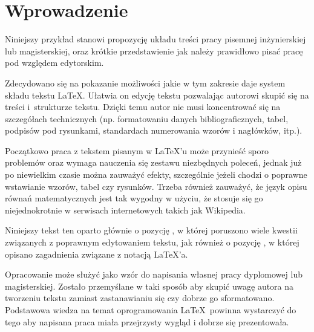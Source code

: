 \section{Wprowadzenie}

Niniejszy przykład stanowi propozycję układu treści pracy pisemnej inżynierskiej lub magisterskiej, oraz krótkie przedstawienie jak należy prawidłowo pisać pracę pod względem edytorskim.

Zdecydowano się na pokazanie możliwości jakie w tym zakresie daje system składu tekstu \LaTeX. Ułatwia on edycję tekstu pozwalając autorowi skupić się na treści i~strukturze tekstu. Dzięki temu autor nie musi koncentrować się na szczegółach technicznych (np. formatowaniu danych bibliograficznych, tabel, podpisów pod rysunkami, standardach numerowania wzorów i nagłówków, itp.).

Początkowo praca z tekstem pisanym w \LaTeX 'u może przynieść sporo problemów oraz wymaga nauczenia się zestawu niezbędnych poleceń, jednak już po niewielkim czasie można zauważyć efekty, szczególnie jeżeli chodzi o poprawne wstawianie wzorów, tabel czy rysunków. Trzeba również zauważyć, że język opisu równań matematycznych jest tak wygodny w użyciu, że stosuje się go niejednokrotnie w serwisach internetowych takich jak Wikipedia.

Niniejszy tekst ten oparto głównie o pozycję \cite{Osuchowska:1998}, w której poruszono wiele kwestii związanych z poprawnym edytowaniem tekstu, jak również o pozycję \cite{latex:2007}, w której opisano zagadnienia związane z notacją \LaTeX 'a.

Opracowanie może służyć jako wzór do napisania własnej pracy dyplomowej lub magisterskiej. Zostało przemyślane w taki sposób aby skupić uwagę autora na tworzeniu tekstu zamiast zastanawianiu się czy dobrze go sformatowano. Podstawowa wiedza na temat oprogramowania \LaTeX\ powinna wystarczyć do tego aby napisana praca miała przejrzysty wygląd i dobrze się prezentowała. 
